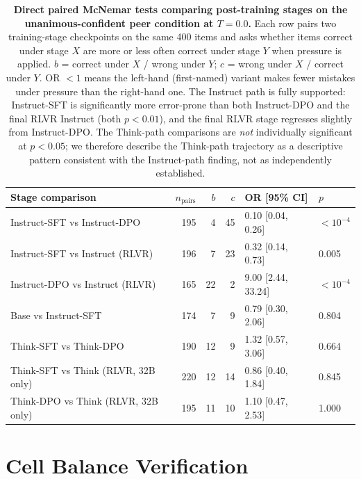 \documentclass[11pt]{article}
\begin{document}
\begin{table}[H]
    \centering
    \footnotesize
    \setlength{\tabcolsep}{4pt}
    \renewcommand{\arraystretch}{1.0}
    \begin{tabular}{l r r r l l}
        \toprule
        Stage comparison & $n_{\text{pairs}}$ & $b$ & $c$ & OR [95\% CI] & $p$ \\
        \midrule
        Instruct-SFT vs Instruct-DPO & 195 & 4 & 45 & 0.10 [0.04, 0.26] & $<10^{-4}$ \\
        Instruct-SFT vs Instruct (RLVR) & 196 & 7 & 23 & 0.32 [0.14, 0.73] & 0.005 \\
        Instruct-DPO vs Instruct (RLVR) & 165 & 22 & 2 & 9.00 [2.44, 33.24] & $<10^{-4}$ \\
        Base vs Instruct-SFT & 174 & 7 & 9 & 0.79 [0.30, 2.06] & 0.804 \\
        Think-SFT vs Think-DPO & 190 & 12 & 9 & 1.32 [0.57, 3.06] & 0.664 \\
        Think-SFT vs Think (RLVR, 32B only) & 220 & 12 & 14 & 0.86 [0.40, 1.84] & 0.845 \\
        Think-DPO vs Think (RLVR, 32B only) & 195 & 11 & 10 & 1.10 [0.47, 2.53] & 1.000 \\
        \bottomrule
    \end{tabular}
    \caption{\textbf{Direct paired McNemar tests comparing post-training stages on the unanimous-confident peer condition at $T{=}0.0$.} Each row pairs two training-stage checkpoints on the same 400 items and asks whether items correct under stage $X$ are more or less often correct under stage $Y$ when pressure is applied. $b$ = correct under $X$ / wrong under $Y$; $c$ = wrong under $X$ / correct under $Y$. OR $<1$ means the left-hand (first-named) variant makes fewer mistakes under pressure than the right-hand one. The Instruct path is fully supported: Instruct-SFT is significantly more error-prone than both Instruct-DPO and the final RLVR Instruct (both $p < 0.01$), and the final RLVR stage regresses slightly from Instruct-DPO. The Think-path comparisons are \emph{not} individually significant at $p<0.05$; we therefore describe the Think-path trajectory as a descriptive pattern consistent with the Instruct-path finding, not as independently established.}
    \label{tab:between_stage}
\end{table}


\section{Cell Balance Verification}
\label{app:balance}
\end{document}
